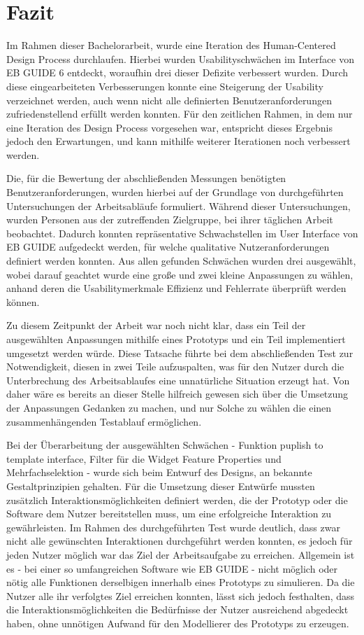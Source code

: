 \chapter{Fazit}\label{ch:summary}

Im Rahmen dieser Bachelorarbeit, wurde eine Iteration des Human-Centered Design Process durchlaufen.
Hierbei wurden Usabilityschwächen im Interface von EB GUIDE 6 entdeckt, woraufhin drei dieser Defizite verbessert wurden.
Durch diese eingearbeiteten Verbesserungen konnte eine Steigerung der Usability verzeichnet werden, auch wenn nicht alle definierten Benutzeranforderungen zufriedenstellend erfüllt werden konnten.
Für den zeitlichen Rahmen, in dem nur eine Iteration des Design Process vorgesehen war, entspricht dieses Ergebnis jedoch den Erwartungen, und kann mithilfe weiterer Iterationen noch verbessert werden.

Die, für die Bewertung der abschließenden Messungen benötigten Benutzeranforderungen, wurden hierbei auf der Grundlage von durchgeführten Untersuchungen der Arbeitsabläufe formuliert.
Während dieser Untersuchungen, wurden Personen aus der zutreffenden Zielgruppe, bei ihrer täglichen Arbeit beobachtet.
Dadurch konnten repräsentative Schwachstellen im User Interface von EB GUIDE aufgedeckt werden, für welche qualitative Nutzeranforderungen definiert werden konnten.
Aus allen gefunden Schwächen wurden drei ausgewählt, wobei darauf geachtet wurde eine große und zwei kleine Anpassungen zu wählen, anhand deren die Usabilitymerkmale Effizienz und Fehlerrate überprüft werden können.

Zu diesem Zeitpunkt der Arbeit war noch nicht klar, dass ein Teil der ausgewählten Anpassungen mithilfe eines Prototyps und ein Teil implementiert umgesetzt werden würde.
Diese Tatsache führte bei dem abschließenden Test zur Notwendigkeit, diesen in zwei Teile aufzuspalten, was für den Nutzer durch die Unterbrechung des Arbeitsablaufes eine unnatürliche Situation erzeugt hat.
Von daher wäre es bereits an dieser Stelle hilfreich gewesen sich über die Umsetzung der Anpassungen Gedanken zu machen, und nur Solche zu wählen die einen zusammenhängenden Testablauf ermöglichen.

Bei der Überarbeitung der ausgewählten Schwächen - Funktion  \glqq puplish to template interface\grqq{}, Filter für die \glqq Widget Feature Properties\grqq{} und  \glqq Mehrfachselektion\grqq{} - wurde sich beim Entwurf des Designs, an bekannte Gestaltprinzipien gehalten.
Für die Umsetzung dieser Entwürfe mussten zusätzlich Interaktionsmöglichkeiten definiert werden, die der Prototyp oder die Software dem Nutzer bereitstellen muss, um eine erfolgreiche Interaktion zu gewährleisten.
Im Rahmen des durchgeführten Test wurde deutlich, dass zwar nicht alle gewünschten Interaktionen durchgeführt werden konnten, es jedoch für jeden Nutzer möglich war das Ziel der Arbeitsaufgabe zu erreichen.
Allgemein ist es - bei einer so umfangreichen Software wie EB GUIDE - nicht möglich oder nötig alle Funktionen derselbigen innerhalb eines Prototyps zu simulieren.
Da die Nutzer alle ihr verfolgtes Ziel erreichen konnten, lässt sich jedoch festhalten, dass die Interaktionsmöglichkeiten die Bedürfnisse der Nutzer ausreichend abgedeckt haben, ohne unnötigen Aufwand für den Modellierer des Prototyps zu erzeugen.

